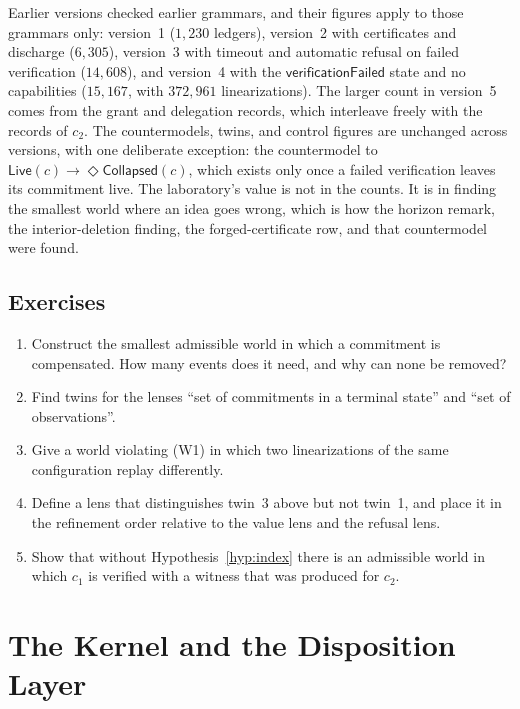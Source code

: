 \documentclass[11pt,openany]{book}
\theoremstyle{remark}
\begin{document}
Earlier versions checked earlier grammars, and their figures apply to
those grammars only: version~1 ($1{,}230$ ledgers), version~2 with
certificates and discharge ($6{,}305$), version~3 with timeout and
automatic refusal on failed verification ($14{,}608$), and version~4 with
the $\mathsf{verificationFailed}$ state and no capabilities ($15{,}167$,
with $372{,}961$ linearizations). The larger count in version~5 comes from
the grant and delegation records, which interleave freely with the
records of $c_2$. The countermodels, twins, and control figures are
unchanged across versions, with one deliberate exception: the countermodel to
$\mathsf{Live}(c)\rightarrow\Diamond\mathsf{Collapsed}(c)$, which exists
only once a failed verification leaves its commitment live. The
laboratory's value is not in the counts. It is in finding the smallest
world where an idea goes wrong, which is how the horizon remark, the
interior-deletion finding, the forged-certificate row, and that
countermodel were found.

\section*{Exercises}
\begin{enumerate}[leftmargin=1.5em]
\item Construct the smallest admissible world in which a commitment is
compensated. How many events does it need, and why can none be removed?
\item Find twins for the lenses ``set of commitments in a terminal state''
and ``set of observations''.
\item Give a world violating (W1) in which two linearizations of the same
configuration replay differently.
\item Define a lens that distinguishes twin~3 above but not twin~1, and
place it in the refinement order relative to the value lens and the
refusal lens.
\item Show that without Hypothesis~\ref{hyp:index} there is an admissible
world in which $c_1$ is verified with a witness that was produced for
$c_2$.
\end{enumerate}

\chapter{The Kernel and the Disposition Layer}
\label{ch:layers}
\end{document}
